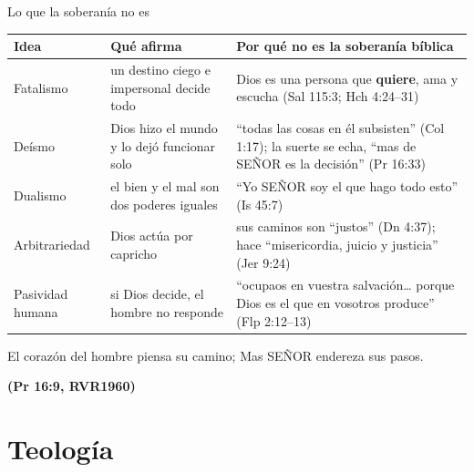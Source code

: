 \documentclass[hyperref={bookmarks=false},aspectratio=169]{beamer}
\newcommand{\SENOR}{S{\fontsize{0.78em}{1em}\selectfont EÑOR}}
\newcommand{\fuente}[1]{\par\hfill{\upshape\bfseries\footnotesize\textcolor{azul}{#1}}}
\newcommand{\destacar}[1]{\textbf{\textcolor{azul}{#1}}}
\begin{document}
\begin{frame}{Lo que la soberanía no es}
\scriptsize\renewcommand{\arraystretch}{1.2}
\begin{tabular}{@{}>{\RaggedRight\arraybackslash}p{2.3cm}>{\RaggedRight\arraybackslash}p{4.6cm}>{\RaggedRight\arraybackslash}p{4.9cm}@{}}
\toprule
\textbf{Idea} & \textbf{Qué afirma} & \textbf{Por qué no es la soberanía bíblica} \\ \midrule
Fatalismo & un destino ciego e impersonal decide todo & Dios es una persona que \destacar{quiere}, ama y escucha (Sal 115:3; Hch 4:24--31) \\
Deísmo & Dios hizo el mundo y lo dejó funcionar solo & ``todas las cosas en él subsisten'' (Col 1:17); la suerte se echa, ``mas de \SENOR{} es la decisión'' (Pr 16:33) \\
Dualismo & el bien y el mal son dos poderes iguales & ``Yo \SENOR{} soy el que hago todo esto'' (Is 45:7) \\
Arbitrariedad & Dios actúa por capricho & sus caminos son ``justos'' (Dn 4:37); hace ``misericordia, juicio y justicia'' (Jer 9:24) \\
Pasividad humana & si Dios decide, el hombre no responde & ``ocupaos en vuestra salvación\ldots{} porque Dios es el que en vosotros produce'' (Flp 2:12--13) \\
\bottomrule
\end{tabular}\par\medskip
\begin{cita}El corazón del hombre piensa su camino; Mas \SENOR{} endereza sus pasos.\fuente{(Pr 16:9, RVR1960)}\end{cita}
\end{frame}

\section{Teología}
\end{document}
